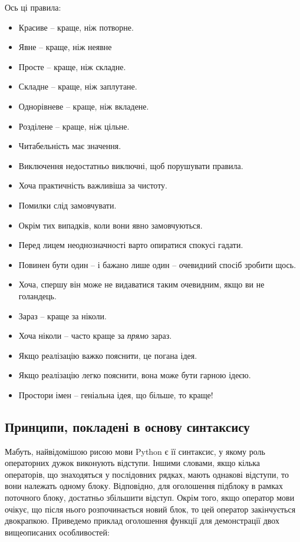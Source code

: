 \documentclass[a4paper, 12pt, onsedie]{article}
\begin{document}
    Ось ці правила:
    \begin{itemize}
        \item Красиве -- краще, ніж потворне.
        \item Явне -- краще, ніж неявне
        \item Просте -- краще, ніж складне.
        \item Складне -- краще, ніж заплутане.
        \item Однорівневе -- краще, ніж вкладене.
        \item Розділене -- краще, ніж цільне.
        \item Читабельність має значення.
        \item Виключення недостатньо виключні, щоб порушувати правила.
        \item Хоча практичність важливіша за чистоту.
        \item Помилки слід замовчувати.
        \item Окрім тих випадків, коли вони явно замовчуються.
        \item Перед лицем неоднозначності варто опиратися спокусі гадати.
        \item Повинен бути один -- і бажано лише один -- очевидний спосіб зробити щось.
        \item Хоча, спершу він може не видаватися таким очевидним, якщо ви не голандець.
        \item Зараз -- краще за ніколи.
        \item Хоча ніколи -- часто краще за \emph{прямо} зараз.
        \item Якщо реалізацію важко пояснити, це погана ідея.
        \item Якщо реалізацію легко пояснити, вона може бути гарною ідеєю.
        \item Простори імен -- геніальна ідея, що більше, то краще!
    \end{itemize}

\subsection{Принципи, покладені в основу синтаксису}
    Мабуть, найвідомішою рисою мови Python є її синтаксис, у якому роль операторних дужок
    виконують відступи. Іншими словами, якщо кілька операторів, що знаходяться у послідовних 
    рядках, мають однакові відступи, то вони належать одному блоку. Відповідно, для оголошення
    підблоку в рамках поточного блоку, достатньо збільшити відступ. Окрім того, якщо оператор
    мови очікує, що після нього розпочинається новий блок, то цей оператор закінчується 
    двокрапкою. Приведемо приклад оголошення функції для демонстрації двох вищеописаних
    особливостей:
\end{document}
